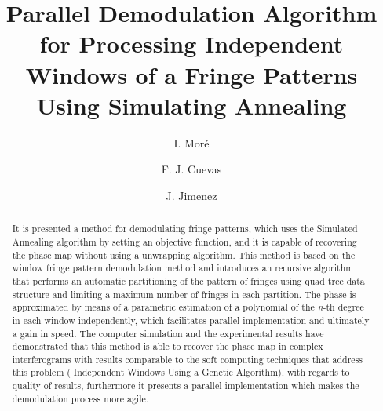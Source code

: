 \documentclass[review]{elsarticle}
\begin{document}
\begin{frontmatter}

\title{Parallel Demodulation Algorithm for Processing Independent Windows of a Fringe Patterns Using Simulating Annealing}

\author[cio]{I. Mor\'e } 
\author[cio]{F. J. Cuevas}
\author[cidesi]{J. Jimenez}

\address[cio]{Centro de Investigaciones en \'Optica, A.C.\\ Loma del Bosque 115, Colonia Lomas del Campestre 	Le\'on, Guanajuato CP 37150}
\address[cidesi]{Centro de Ingenier\'ia y Desarrollo Industrial, \\ 	Alianza Sur No. 203. Autopista al Aeropuerto Km. 10
	Apodaca N. L.}






\begin{abstract}
It is presented a method for demodulating fringe patterns, which uses the Simulated Annealing algorithm by setting an objective function, and it is capable of recovering the phase map without using a unwrapping algorithm. This method is based on the window fringe pattern demodulation method and introduces an recursive algorithm that performs an automatic partitioning of the pattern of fringes using quad tree data structure and limiting a maximum number of fringes in each partition. The phase is approximated by means of a parametric estimation of a polynomial of the \textit{n}-th degree in each window independently, which facilitates parallel implementation and ultimately a gain in speed. The computer simulation and the experimental results have demonstrated that this method is able to recover the phase map in complex interferograms with results comparable to the soft computing techniques that address this problem ( Independent
Windows Using a Genetic Algorithm), with regards to quality of results, furthermore it presents a parallel implementation which makes the demodulation process more agile.
\end{abstract}


\end{frontmatter}
\end{document}
